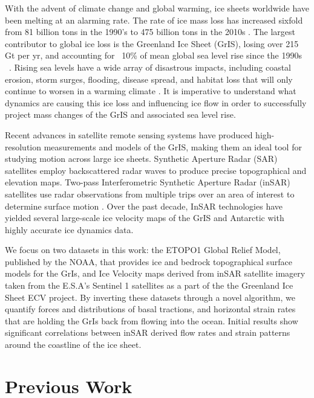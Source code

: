\documentclass{article}
\begin{document}
With the advent of climate change and global warming, ice sheets worldwide have been melting at an alarming rate. The rate of ice mass loss has increased sixfold from 81 billion tons in the 1990’s to 475 billion tons in the 2010s \cite{the_imbie_team_mass_2020}. The largest contributor to global ice loss is the Greenland Ice Sheet (GrIS), losing over 215 Gt per yr, and accounting for ~10\% of mean global sea level rise since the 1990s ~\cite{stocker_climate_2013}. Rising sea levels have a wide array of disastrous impacts, including coastal erosion, storm surges, flooding, disease spread, and habitat loss that will only continue to worsen in a warming climate \cite{pattyn_greenland_2018}. It is imperative to understand what dynamics are causing this ice loss and influencing ice flow in order to successfully project mass changes of the GrIS and associated sea level rise.

Recent advances in satellite remote sensing systems have produced high-resolution measurements and models of the GrIS, making them an ideal tool for studying motion across large ice sheets. Synthetic Aperture Radar (SAR) satellites employ backscattered radar waves to produce precise topographical and elevation maps. Two-pass Interferometric Synthetic Aperture Radar (inSAR) satellites use radar observations from multiple trips over an area of interest to determine surface motion \cite{wild_differential_2019}. Over the past decade, InSAR technologies have yielded several large-scale ice velocity maps of the GrIS and Antarctic with highly accurate ice dynamics data. 

We focus on two datasets in this work: the ETOPO1 Global Relief Model, published by the NOAA, that provides ice and bedrock topographical surface models for the GrIs, and Ice Velocity maps derived from inSAR satellite imagery taken from the E.S.A's Sentinel 1 satellites as a part of the the Greenland Ice Sheet ECV project. By inverting these datasets through a novel algorithm, we quantify forces and distributions of basal tractions, and horizontal strain rates that are holding the GrIs back from flowing into the ocean. Initial results show significant correlations between inSAR derived flow rates and strain patterns around the coastline of the ice sheet.

\section{Previous Work}
\end{document}
